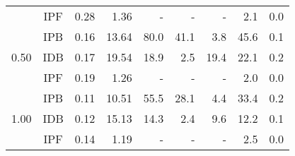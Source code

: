\begin{tabular}{ccrrrrrrr}
                      & IPF &                     0.28 &            1.36 &                    - &                          - &                  - &              2.1 &     0.0 \\[2pt]
\multirow{3}{*}{0.50} & IPB &                     0.16 &           13.64 &                 80.0 &                       41.1 &                3.8 &             45.6 &     0.1 \\
                      & IDB &                     0.17 &           19.54 &                 18.9 &                        2.5 &               19.4 &             22.1 &     0.2 \\
                      & IPF &                     0.19 &            1.26 &                    - &                          - &                  - &              2.0 &     0.0 \\[2pt]
\multirow{3}{*}{1.00} & IPB &                     0.11 &           10.51 &                 55.5 &                       28.1 &                4.4 &             33.4 &     0.2 \\
                      & IDB &                     0.12 &           15.13 &                 14.3 &                        2.4 &                9.6 &             12.2 &     0.1 \\
                      & IPF &                     0.14 &            1.19 &                    - &                          - &                  - &              2.5 &     0.0 \\
\bottomrule
\end{tabular}

